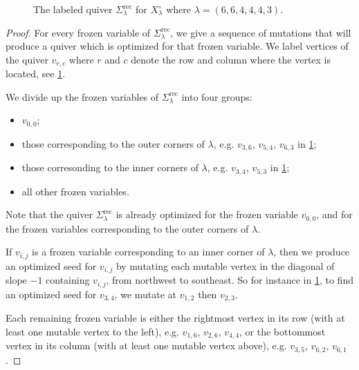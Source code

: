 \documentclass{amsart}
\theoremstyle{definition}
\numberwithin{equation}{section}
\newcommand{\rect}{\mathrm{rec}}
\newcommand{\openSchub}{{X_{\lambda}^{\circ}}}
\begin{document}
\begin{figure}[ht]
	\caption{
The labeled quiver $\Sigma_{\lambda}^{\rect}$ for $\openSchub$
where $\lambda = (6,6,4,4,4,3)$. 
\label{fig:opt}}
\end{figure}


\begin{proof}
For every frozen variable of $\Sigma_{\lambda}^{\rect}$,
we give a sequence of mutations that will produce a quiver
which is optimized for that frozen variable.  We label
vertices of the quiver $v_{r,c}$ where $r$ and $c$ denote
the row and column where the vertex is located, see \cref{fig:opt}.

	We divide up the frozen variables of $\Sigma_{\lambda}^{\rect}$
	into four groups:
	\begin{itemize}
	\item $v_{0,0}$;
	\item those corresponding to the outer corners of 
		$\lambda$, e.g.
	$v_{3,6}$, $v_{5,4}$, $v_{6,3}$ in \cref{fig:opt};
	\item those corresonding to the inner corners of $\lambda$,
		e.g. $v_{3,4}$, $v_{5,3}$ in \cref{fig:opt};
	\item all other frozen variables.
	\end{itemize}

	Note that the quiver $\Sigma_{\lambda}^{\rect}$ is already 
	optimized for the frozen variable $v_{0,0}$,
	 and for the frozen variables
	corresponding to the outer corners of $\lambda$.

	If $v_{i,j}$ is a frozen variable corresponding to an inner
	corner of $\lambda$, then we produce an optimized seed for 
	$v_{i,j}$ by mutating each mutable vertex in the diagonal
	of slope $-1$ containing $v_{i,j}$, from northwest to southeast.
	So for instance in \cref{fig:opt}, to find an optimized seed for 
	$v_{3,4}$, we mutate at $v_{1,2}$ then $v_{2,3}$.

Each remaining frozen variable is either the rightmost vertex in its
row (with at least one mutable vertex to the left), e.g.
$v_{1,6}$, $v_{2,6}$, $v_{4,4}$, 
or the bottommost vertex in its column (with at least one mutable
vertex above), e.g. $v_{3,5}$, $v_{6,2}$, $v_{6,1}$. 


\end{proof}
\end{document}
